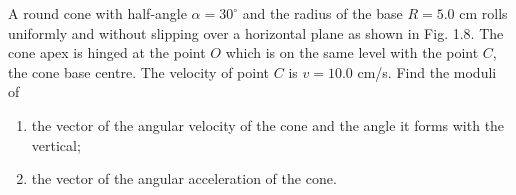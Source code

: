 
\item A round cone with half-angle \( \alpha = 30^\circ \) and the radius of the base \( R = 5.0 \) cm rolls uniformly and without slipping over a horizontal plane as shown in Fig. 1.8. The cone apex is hinged at the point \( O \) which is on the same level with the point \( C \), the cone base centre. The velocity of point \( C \) is \( v = 10.0 \) cm/s. Find the moduli of
\begin{center}
\end{center}
\begin{enumerate}
    \item the vector of the angular velocity of the cone and the angle it forms with the vertical;
    \item the vector of the angular acceleration of the cone.
\end{enumerate}